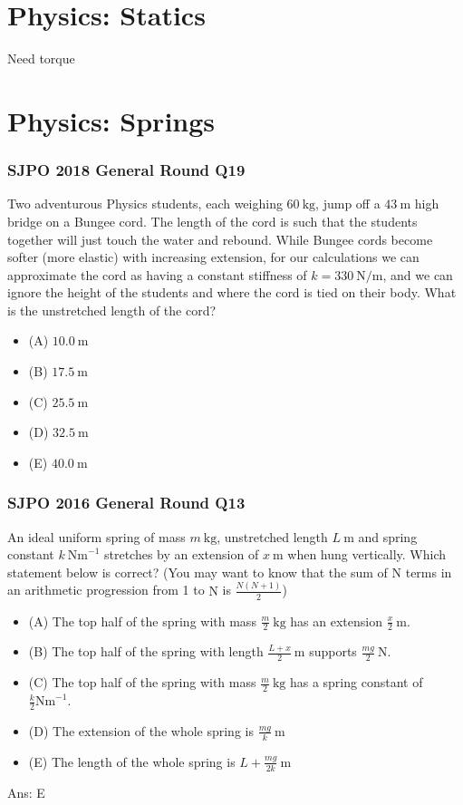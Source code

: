 \documentclass{article}
\begin{document}
\section{Physics: Statics}
Need torque
\section{Physics: Springs}
\subsubsection{SJPO 2018 General Round Q19}
Two adventurous Physics students, each weighing $60 \mathrm{~kg}$, jump off a $43 \mathrm{~m}$ high bridge on a Bungee cord. The length of the cord is such that the students together will just touch the water and rebound. While Bungee cords become softer (more elastic) with increasing extension, for our calculations we can approximate the cord as having a constant stiffness of $k=330 \mathrm{~N} / \mathrm{m}$, and we can ignore the height of the students and where the cord is tied on their body. What is the unstretched length of the cord?
\begin{itemize}
\item[] (A) $10.0 \mathrm{~m}$
\item[] (B) $17.5 \mathrm{~m}$
\item[] (C) $25.5 \mathrm{~m}$
\item[] (D) $32.5 \mathrm{~m}$
\item[] (E) $40.0 \mathrm{~m}$
\end{itemize}
\subsubsection{SJPO 2016 General Round Q13}
An ideal uniform spring of mass $m \mathrm{~kg}$, unstretched length $L \mathrm{~m}$ and spring constant $k\  \mathrm{Nm}^{-1}$ stretches by an extension of $x \mathrm{~m}$ when hung vertically. Which statement below is correct? (You may want to know that the sum of $\mathrm{N}$ terms in an arithmetic progression from 1 to $\mathrm{N}$ is $\frac{N(N+1)}{2}$)
\begin{itemize}
\item[] (A) The top half of the spring with mass $\frac{m}{2} \mathrm{~kg}$ has an extension $\frac{x}{2} \mathrm{~m}$.
\item[] (B) The top half of the spring with length $\frac{L+x}{2} \mathrm{~m}$ supports $\frac{m g}{2} \mathrm{~N}$.
\item[] (C) The top half of the spring with mass $\frac{m}{2} \mathrm{~kg}$ has a spring constant of $\frac{k}{2} \mathrm{Nm}^{-1}$.
\item[] (D) The extension of the whole spring is $\frac{m g}{k} \mathrm{~m}$
\item[] (E) The length of the whole spring is $L+\frac{m g}{2 k} \mathrm{~m}$
\end{itemize}
Ans: \ifpaper E \fi
\end{document}
